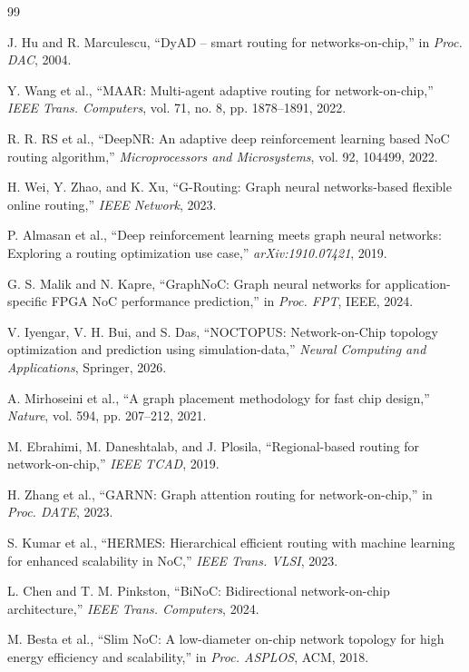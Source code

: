 \documentclass[conference]{IEEEtran}
\begin{document}
\begin{thebibliography}{99}

J. Hu and R. Marculescu, ``DyAD -- smart routing for networks-on-chip,'' in \textit{Proc. DAC}, 2004.

Y. Wang et al., ``MAAR: Multi-agent adaptive routing for network-on-chip,'' \textit{IEEE Trans. Computers}, vol. 71, no. 8, pp. 1878--1891, 2022.

R. R. RS et al., ``DeepNR: An adaptive deep reinforcement learning based NoC routing algorithm,'' \textit{Microprocessors and Microsystems}, vol. 92, 104499, 2022.

H. Wei, Y. Zhao, and K. Xu, ``G-Routing: Graph neural networks-based flexible online routing,'' \textit{IEEE Network}, 2023.

P. Almasan et al., ``Deep reinforcement learning meets graph neural networks: Exploring a routing optimization use case,'' \textit{arXiv:1910.07421}, 2019.

G. S. Malik and N. Kapre, ``GraphNoC: Graph neural networks for application-specific FPGA NoC performance prediction,'' in \textit{Proc. FPT}, IEEE, 2024.

V. Iyengar, V. H. Bui, and S. Das, ``NOCTOPUS: Network-on-Chip topology optimization and prediction using simulation-data,'' \textit{Neural Computing and Applications}, Springer, 2026.

A. Mirhoseini et al., ``A graph placement methodology for fast chip design,'' \textit{Nature}, vol. 594, pp. 207--212, 2021.

M. Ebrahimi, M. Daneshtalab, and J. Plosila, ``Regional-based routing for network-on-chip,'' \textit{IEEE TCAD}, 2019.

H. Zhang et al., ``GARNN: Graph attention routing for network-on-chip,'' in \textit{Proc. DATE}, 2023.

S. Kumar et al., ``HERMES: Hierarchical efficient routing with machine learning for enhanced scalability in NoC,'' \textit{IEEE Trans. VLSI}, 2023.

L. Chen and T. M. Pinkston, ``BiNoC: Bidirectional network-on-chip architecture,'' \textit{IEEE Trans. Computers}, 2024.

M. Besta et al., ``Slim NoC: A low-diameter on-chip network topology for high energy efficiency and scalability,'' in \textit{Proc. ASPLOS}, ACM, 2018.


\end{thebibliography}
\end{document}

